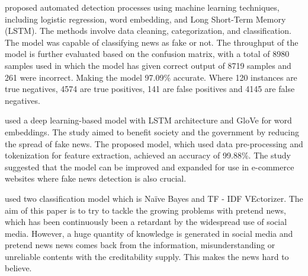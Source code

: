 \begin{refsection}
proposed automated detection processes using machine learning techniques, including logistic regression, word embedding, and Long Short-Term Memory (LSTM). The methods involve data cleaning, categorization, and classification. The model was capable of classifying news as fake or not. The throughput of the model is further evaluated based on the confusion matrix, with a total of 8980 samples used in which the model has given correct output of 8719 samples and 261 were incorrect. Making the model 97.09\% accurate. Where 120 instances are true negatives, 4574 are true positives, 141 are false positives and 4145 are false negatives.

used a deep learning-based model with LSTM architecture and GloVe for word embeddings. The study aimed to benefit society and the government by reducing the spread of fake news. The proposed model, which used data pre-processing and tokenization for feature extraction, achieved an accuracy of 99.88\%.
The study suggested that the model can be improved and expanded for use in e-commerce websites where fake news detection is also crucial.


used two classification model which is Naïve Bayes and TF - IDF VEctorizer. The aim of this paper is to try to tackle the growing problems with pretend news, which has been continuously been a retardant by the widespread use of social media. However, a huge quantity of knowledge is generated in social media and pretend news news comes back from the information, misunderstanding or unreliable contents with the creditability supply. This makes the news hard to believe.



\clearpage

\printbibliography[heading=subbibintoc, title={\centering Notes}]
\end{refsection}